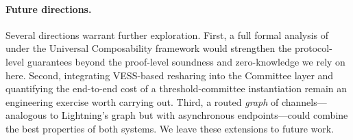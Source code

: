 \paragraph{Future directions.}
Several directions warrant further exploration. First, a full formal analysis of \thunderbolt under the Universal Composability framework would strengthen the protocol-level guarantees beyond the proof-level soundness and zero-knowledge we rely on here. Second, integrating VESS-based resharing into the Committee layer and quantifying the end-to-end cost of a threshold-committee instantiation remain an engineering exercise worth carrying out. Third, a routed \emph{graph} of \thunderbolt channels---analogous to Lightning's graph but with asynchronous endpoints---could combine the best properties of both systems. We leave these extensions to future work.
